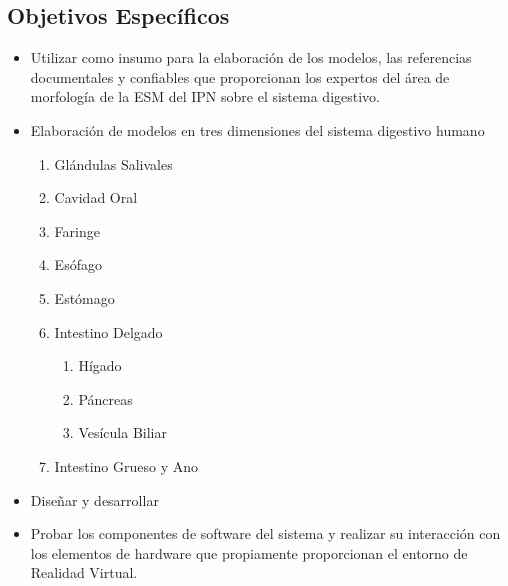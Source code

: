\subsection{Objetivos Específicos}
\begin{itemize}
	\item Utilizar como insumo para la elaboración de los modelos, las referencias documentales y confiables que proporcionan los expertos del área de morfología de la ESM del IPN sobre el sistema digestivo.
	\item Elaboración de modelos en tres dimensiones del sistema digestivo humano
	\begin{enumerate}
		\item Glándulas Salivales
		\item Cavidad Oral
		\item Faringe
		\item Esófago
		\item Estómago
		\item Intestino Delgado
		\begin{enumerate}
		  \item Hígado
		  \item Páncreas
		  \item Vesícula Biliar
		\end{enumerate}
		\item Intestino Grueso y Ano  
	\end{enumerate}
	\item Diseñar y desarrollar
	\item Probar los componentes de software del sistema y realizar su interacción con los elementos de hardware que propiamente proporcionan el entorno de  Realidad Virtual.	
\end{itemize}

